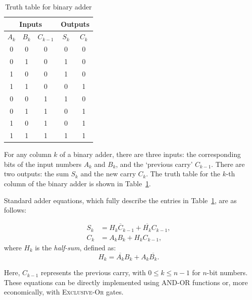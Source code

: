 \documentclass[a4paper,12pt]{article}
\begin{document}
	\begin{table}[h!]
		\centering
		\caption{Truth table for binary adder}
		\label{table:truth-table}
		\begin{tabular}{|c|c|c||c|c|}
			\hline
			\multicolumn{3}{|c||}{\textbf{Inputs}} & \multicolumn{2}{c|}{\textbf{Outputs}} \\
			\hline
			$A_k$ & $B_k$ & $C_{k-1}$ & $S_k$ & $C_k$ \\
			\hline
			0 & 0 & 0 & 0 & 0 \\
			0 & 1 & 0 & 1 & 0 \\
			1 & 0 & 0 & 1 & 0 \\
			1 & 1 & 0 & 0 & 1 \\
			0 & 0 & 1 & 1 & 0 \\
			0 & 1 & 1 & 0 & 1 \\
			1 & 0 & 1 & 0 & 1 \\
			1 & 1 & 1 & 1 & 1 \\
			\hline
		\end{tabular}
	\end{table}
		For any column $k$ of a binary adder, there are three inputs: the corresponding bits of the input numbers $A_k$ and $B_k$, and the `previous carry' $C_{k-1}$. There are two outputs: the sum $S_k$ and the new carry $C_k$. The truth table for the $k$-th column of the binary adder is shown in Table~\ref{table:truth-table}.
	
	\noindent
	Standard adder equations, which fully describe the entries in Table~\ref{table:truth-table}, are as follows:
	
	\begin{align*}
		S_k &= H_k \overline{C}_{k-1} + \overline{H_k} C_{k-1}, \\
		C_k &= A_k B_k + H_k C_{k-1},
	\end{align*}
	where $H_k$ is the \textit{half-sum}, defined as:
	\[
	H_k = \overline{A_k}B_k + A_k\overline{B_k}.
	\]
	
	Here, $C_{k-1}$ represents the previous carry, with $0 \leq k \leq n-1$ for $n$-bit numbers. These equations can be directly implemented using \textsc{AND-OR} functions or, more economically, with \textsc{Exclusive-Or} gates.
	
\end{document}
